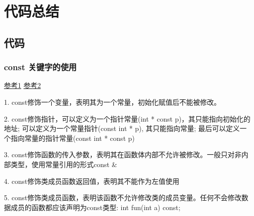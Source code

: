 \chapter{代码总结}
\section{代码}
\subsection{const 关键字的使用}
\href{https://blog.csdn.net/lf1570180470/article/details/56677748}{参考1}
\href{https://www.cnblogs.com/azbane/p/7266747.html}{参考2}

1. const修饰一个变量，表明其为一个常量，初始化赋值后不能被修改。

2. const修饰指针，可以定义为一个指针常量(int * const p)，其只能指向初始化的地址; 可以定义为一个常量指针(const int * p), 其只能指向常量; 最后可以定义一个指向常量的指针常量(const int * const p)

3. const修饰函数的传入参数，表明其在函数体内部不允许被修改。一般只对非内部类型，使用常量引用的形式const \&

4. const修饰类成员函数返回值，表明其不能作为左值使用

5. const修饰类成员函数，表明该函数不允许修改类的成员变量。任何不会修改数据成员的函数都应该声明为const类型: int fun(int a) const;